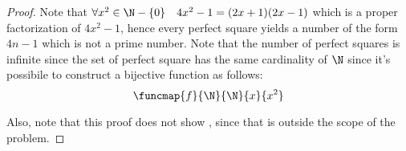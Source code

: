 \documentclass[a4paper, 12pt]{report}
\begin{document}
    \begin{proof}
        Note that $\forall x^2 \in \N - \{0\} \quad 4x^2 - 1 = (2x +1)(2x -1)$ which is a proper factorization of $4x^2 -1$, hence every perfect square yields a number of the form $4n -1$ which is not a prime number. Note that the number of perfect squares is infinite since the set of perfect square has the same cardinality of $\N$ since it's possibile to construct a bijective function as follows: $$\funcmap{f}{\N}{\N}{x}{x^2}$$

        Also, note that this proof does not show , since that is outside the scope of the problem.
    \end{proof}
\end{document}
